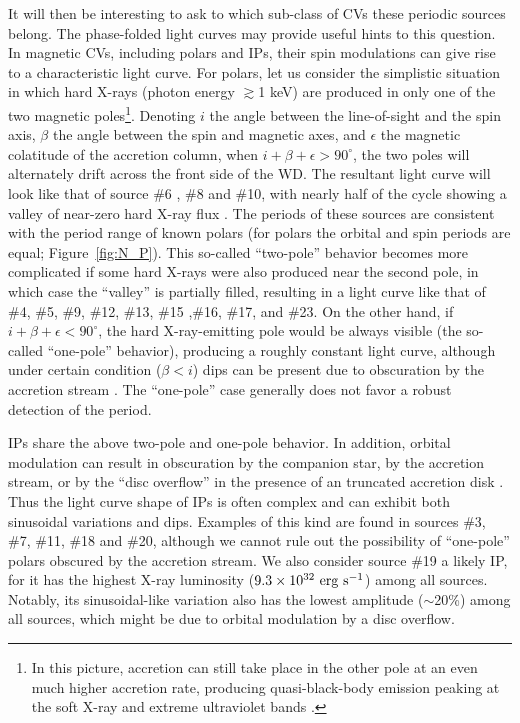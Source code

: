 \documentclass[fleqn,usenatbib]{mnras}
\begin{document}
It will then be interesting to ask to which sub-class of CVs these periodic sources belong. The phase-folded light curves may provide useful hints to this question. 
In magnetic CVs, including polars and IPs, their spin modulations can give rise to a characteristic light curve. For polars, let us consider the simplistic situation in which hard X-rays (photon energy $\gtrsim$1 keV) are produced in only one of the two magnetic poles\footnote{In this picture, accretion can still take place in the other pole at an even much higher accretion rate, producing quasi-black-body emission peaking at the soft X-ray and extreme ultraviolet bands \citep{2001cvs..book.....H}.}.
Denoting $i$ the angle between the line-of-sight and the spin axis, $\beta$ the angle between the spin and magnetic axes, and $\epsilon$ the magnetic colatitude of the accretion column, when $i+\beta+\epsilon > 90^{\circ}$, the two poles will alternately drift across the front side of the WD. 
The resultant light curve will look like that of source \#6 , \#8 and \#10, with nearly half of the cycle showing a valley of near-zero hard X-ray flux \citep{1985A&A...148L..14H}. 
The periods of these sources are consistent with the period range of known polars (for polars the orbital and spin periods are equal; Figure~\ref{fig:N_P}).
This so-called ``two-pole'' behavior becomes more complicated if some hard X-rays were also produced near the second pole, in which case the ``valley'' is partially filled, resulting in a light curve like that of \#4, \#5, \#9, \#12, \#13, \#15 ,\#16, \#17, and \#23. 
On the other hand, if $i+\beta+\epsilon < 90^{\circ}$, the hard X-ray-emitting pole would be always visible (the so-called ``one-pole'' behavior), producing a roughly constant light curve, although under certain condition ($\beta < i$) dips can be present due to obscuration by the accretion stream \citep{2001cvs..book.....H}. The ``one-pole'' case generally does not favor a robust detection of the period. 

IPs share the above two-pole and one-pole behavior. 
In addition, orbital modulation can result in obscuration by the companion star,
by the accretion stream, or by the ``disc overflow'' in the presence of an truncated accretion disk \citep{1996MNRAS.280..937N}. 
Thus the light curve shape of IPs is often complex and can exhibit both sinusoidal variations and dips. Examples of this kind are found in sources \#3, \#7, \#11, \#18 and \#20, although we cannot rule out the possibility of ``one-pole'' polars obscured by the accretion stream.
We also consider source \#19 a likely IP, for it has the highest X-ray luminosity ($9.3\times10^{32}{\rm~erg~s^{-1}}$) among all sources. Notably, its sinusoidal-like variation also has the lowest amplitude ($\sim$20\%) among all sources, which might be due to orbital modulation by a disc overflow. 
\end{document}
